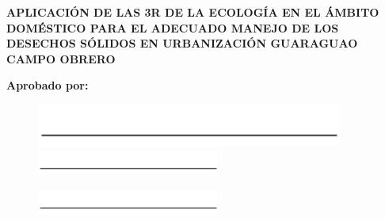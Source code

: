 \begin{center}
    \textbf{APLICACIÓN DE LAS 3R DE LA ECOLOGÍA EN EL ÁMBITO DOMÉSTICO PARA EL ADECUADO MANEJO DE LOS DESECHOS SÓLIDOS EN URBANIZACIÓN GUARAGUAO CAMPO OBRERO}
\end{center}

\vspace*{1.5cm}

\begin{center}
    \textbf{Aprobado por:}
\end{center}

\vspace*{3cm}

\begin{figure}[h]
   \begin{minipage}{0.48\textwidth}
     \centering
     \includegraphics[width=6.cm]{Media/line.jpg}
   \end{minipage}\hfill
   \begin{minipage}{0.48\textwidth}
     \centering
     \includegraphics[width=6cm]{Media/line.jpg}
   \end{minipage}
\end{figure}

\vspace{1.5cm}

\begin{figure}[h]
    \centering
    \includegraphics[width=6cm]{Media/line.jpg}
\end{figure}

\newpage